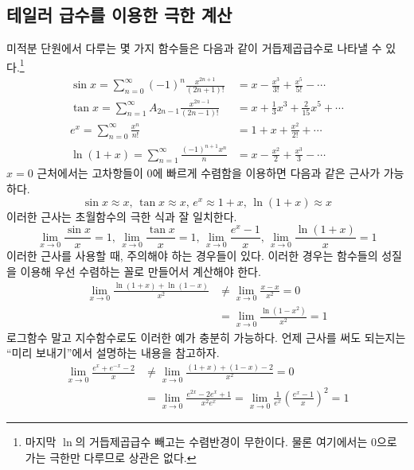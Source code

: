 \documentclass{scrartcl}
\newcommand{\infsum}[1]{\sum^\infty_{#1}}
\begin{document}
\subsection{테일러 급수를 이용한 극한 계산}
미적분 단원에서 다루는 몇 가지 함수들은 다음과 같이 거듭제곱급수로 나타낼 수 있다.\footnote{마지막 \(\ln\)의 거듭제곱급수 빼고는 수렴반경이 무한이다. 물론 여기에서는 0으로 가는 극한만 다루므로 상관은 없다.}
\begin{align*}
\sin x=\infsum{n = 0}(-1)^n\frac{x^{2n+1}}{(2n+1)!}&=x-\frac{x^3}{3!}+\frac{x^5}{5!}-\cdots \\
\tan x=\infsum{n = 1}A_{2n-1}\frac{x^{2n-1}}{(2n-1)!}&=x+\frac{1}{3}x^3+\frac{2}{15}x^5+\cdots \\
e^x=\infsum{n=0}\frac{x^n}{n!}&=1+x+\frac{x^2}{2!}+\cdots \\
\ln (1+x)=\infsum{n=1}\frac{(-1)^{n+1}x^n}{n}&=x-\frac{x^2}{2}+\frac{x^3}{3}-\cdots
\end{align*}
\(x=0\) 근처에서는 고차항들이 0에 빠르게 수렴함을 이용하면 다음과 같은 근사가 가능하다.
\[
\sin x\approx x,\,\tan x\approx x,\,e^x\approx 1+x,\,\ln(1+x)\approx x
\]
이러한 근사는 초월함수의 극한 식과 잘 일치한다.
\[
\lim_{x\to0}\frac{\sin x}{x}=1,\,\lim_{x\to0}\frac{\tan x}{x}=1,\,\lim_{x\to0}\frac{e^x-1}{x},\,\lim_{x\to0}\frac{\ln(1+x)}{x}=1
\]
이러한 근사를 사용할 때, 주의해야 하는 경우들이 있다. 이러한 경우는 함수들의 성질을 이용해 우선 수렴하는 꼴로 만들어서 계산해야 한다.
\begin{align*}
\lim_{x\to0}\frac{\ln(1+x)+\ln(1-x)}{x^2}&\neq\lim_{x\to0}\frac{x - x}{x^2}=0 \tag{틀린 풀이} \\
&=\lim_{x\to0}\frac{\ln(1-x^2)}{x^2}=1 \tag{맞는 풀이}
\end{align*}
로그함수 말고 지수함수로도 이러한 예가 충분히 가능하다. 언제 근사를 써도 되는지는 ``미리 보내기''에서 설명하는 내용을 참고하자.
\begin{align*}
\lim_{x\to0}\frac{e^x+e^{-x}-2}{x}&\neq\lim_{x\to0}\frac{(1+x)+(1-x)-2}{x^2}=0 \tag{틀린 풀이} \\
&=\lim_{x\to0}\frac{e^{2x}-2e^x+1}{x^2e^x}=\lim_{x\to0}\frac{1}{e^x}\left(\frac{e^x-1}{x}\right)^2=1 \tag{맞는 풀이}
\end{align*}
\end{document}
